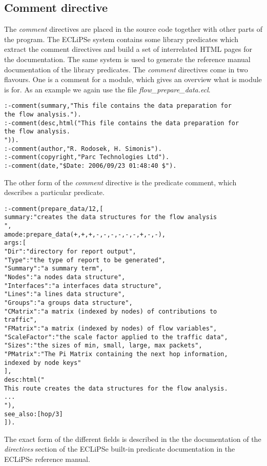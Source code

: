 \documentclass[a4paper,12pt]{report}
\begin{document}
\subsection{Comment directive}
The {\it comment} directives are placed in the source code together with other parts of the program. The ECLiPSe system contains some library predicates which extract the comment directives and build a set of interrelated HTML pages for the documentation. The same system is used to generate the reference manual documentation of the library predicates. The {\it comment} directives come in two flavours. One is a comment for a module, which gives an overview what is module is for. As an example we again use the file {\it flow\_prepare\_data.ecl}.
{\small
\begin{verbatim}
:-comment(summary,"This file contains the data preparation for 
the flow analysis.").
:-comment(desc,html("This file contains the data preparation for 
the flow analysis.
")).
:-comment(author,"R. Rodosek, H. Simonis").
:-comment(copyright,"Parc Technologies Ltd").
:-comment(date,"$Date: 2006/09/23 01:48:40 $").
\end{verbatim}
}
The other form of the {\it comment} directive is the predicate comment, which describes a particular predicate.
{\small
\begin{verbatim}
:-comment(prepare_data/12,[
summary:"creates the data structures for the flow analysis
",
amode:prepare_data(+,+,+,-,-,-,-,-,-,+,-,-),
args:[
"Dir":"directory for report output",
"Type":"the type of report to be generated",
"Summary":"a summary term",
"Nodes":"a nodes data structure",
"Interfaces":"a interfaces data structure",
"Lines":"a lines data structure",
"Groups":"a groups data structure",
"CMatrix":"a matrix (indexed by nodes) of contributions to 
traffic",
"FMatrix":"a matrix (indexed by nodes) of flow variables",
"ScaleFactor":"the scale factor applied to the traffic data",
"Sizes":"the sizes of min, small, large, max packets",
"PMatrix":"The Pi Matrix containing the next hop information, 
indexed by node keys"
],
desc:html("
This route creates the data structures for the flow analysis. 
...
"),
see_also:[hop/3]
]).

\end{verbatim}
}
The exact form of the different fields is described in the the documentation of the {\it directives} section of the ECLiPSe built-in predicate documentation in the ECLiPSe reference manual.
\end{document}
